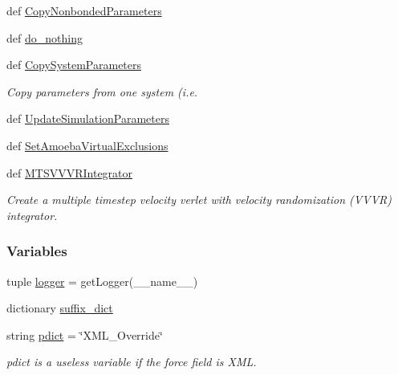\begin{DoxyCompactItemize}
\item 
def \hyperlink{namespaceforcebalance_1_1openmmio_afead47464a644d9225f9fa8eb568a8ed}{\-Copy\-Nonbonded\-Parameters}
\item 
def \hyperlink{namespaceforcebalance_1_1openmmio_a2bb7add6b813d94f2655372c51fe8fdc}{do\-\_\-nothing}
\item 
def \hyperlink{namespaceforcebalance_1_1openmmio_a8c6ed589ec2b35b8363a529ffdf88eb0}{\-Copy\-System\-Parameters}
\begin{DoxyCompactList}\small\item\em \-Copy parameters from one system (i.\-e. \end{DoxyCompactList}\item 
def \hyperlink{namespaceforcebalance_1_1openmmio_a9f9fc56475dbfcc94a40fef6a84ed25f}{\-Update\-Simulation\-Parameters}
\item 
def \hyperlink{namespaceforcebalance_1_1openmmio_a95d91538d72e354fc95433539c42450c}{\-Set\-Amoeba\-Virtual\-Exclusions}
\item 
def \hyperlink{namespaceforcebalance_1_1openmmio_aa085594c11e9cd00ce71f5a8ead72b68}{\-M\-T\-S\-V\-V\-V\-R\-Integrator}
\begin{DoxyCompactList}\small\item\em \-Create a multiple timestep velocity verlet with velocity randomization (\-V\-V\-V\-R) integrator. \end{DoxyCompactList}\end{DoxyCompactItemize}
\subsubsection*{\-Variables}
\begin{DoxyCompactItemize}
\item 
tuple \hyperlink{namespaceforcebalance_1_1openmmio_a0bc9824cef66870d9e86c5fb5de9a2e4}{logger} = get\-Logger(\-\_\-\-\_\-name\-\_\-\-\_\-)
\item 
dictionary \hyperlink{namespaceforcebalance_1_1openmmio_a2a12654c34f4f34e81f575f7b470bf8e}{suffix\-\_\-dict}
\item 
string \hyperlink{namespaceforcebalance_1_1openmmio_a665be6f97a91b103188288e8cd1de9a8}{pdict} = \char`\"{}\-X\-M\-L\-\_\-\-Override\char`\"{}
\begin{DoxyCompactList}\small\item\em pdict is a useless variable if the force field is \-X\-M\-L. \end{DoxyCompactList}\end{DoxyCompactItemize}


